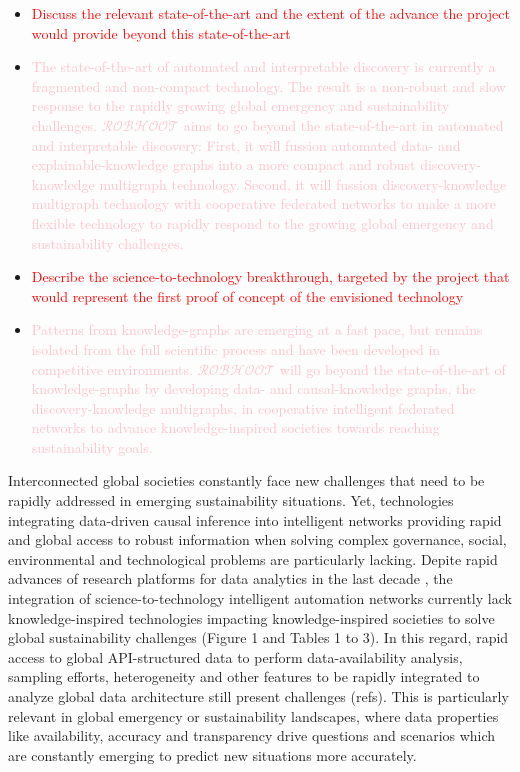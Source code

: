 \documentclass[12pt, a4paper]{article} %
\begin{document}
\begin{itemize}
\item \textcolor{red}{Discuss the relevant state-of-the-art and the
    extent of the advance the project would provide beyond this
    state-of-the-art}
\item \textcolor{pink}{The state-of-the-art of automated and
    interpretable discovery is currently a fragmented and non-compact
    technology. The result is a non-robust and slow response to the
    rapidly growing global emergency and sustainability
    challenges. $\mathcal{ROBHOOT}$ aims to go beyond the
    state-of-the-art in automated and interpretable discovery: First,
    it will fussion automated data- and explainable-knowledge graphs
    into a more compact and robust discovery-knowledge multigraph
    technology. Second, it will fussion discovery-knowledge multigraph
    technology with cooperative federated networks to make a more
    flexible technology to rapidly respond to the growing global
    emergency and sustainability challenges.}
\item \textcolor{red}{Describe the science-to-technology breakthrough,
    targeted by the project that would represent the first proof of
    concept of the envisioned technology}
\item \textcolor{pink}{Patterns from knowledge-graphs are emerging at
    a fast pace, but remains isolated from the full scientific process
    and have been developed in competitive
    environments. $\mathcal{ROBHOOT}$ will go beyond the
    state-of-the-art of knowledge-graphs by developing data- and
    causal-knowledge graphs, the discovery-knowledge multigraphs, in
    cooperative intelligent federated networks to advance
    knowledge-inspired societies towards reaching sustainability
    goals.}
\end{itemize}

Interconnected global societies constantly face new challenges that
need to be rapidly addressed in emerging sustainability
situations. Yet, technologies integrating data-driven causal inference
into intelligent networks providing rapid and global access to robust
information when solving complex governance, social, environmental and
technological problems are particularly lacking. Depite rapid advances
of research platforms for data analytics in the last decade
\citep{Melniketal:2010,Steinruecken,Modulos,Guimera2020,GoogleAI,IrisAI,easeml,datarobot,aito},
the integration of science-to-technology intelligent automation
networks currently lack knowledge-inspired technologies impacting
knowledge-inspired societies to solve global sustainability challenges
(Figure 1 and Tables 1 to 3). In this regard, rapid access to global
API-structured data to perform data-availability analysis, sampling
efforts, heterogeneity and other features to be rapidly integrated to
analyze global data architecture still present challenges (refs). This
is particularly relevant in global emergency or sustainability
landscapes, where data properties like availability, accuracy and
transparency drive questions and scenarios which are constantly
emerging to predict new situations more accurately.
\end{document}
